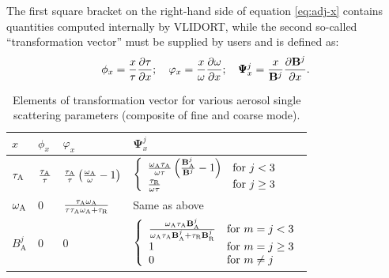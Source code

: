 The first square bracket on the right-hand side of equation
\eqref{eq:adj-x} contains quantities computed internally by VLIDORT, 
while the second so-called “transformation vector” must be supplied 
by users and is defined as:
\begin{equation}
\phi_x = \frac{x}{\tau}\frac{\partial\tau}{\partial x}; \quad 
\varphi_x = \frac{x}{\omega}\frac{\partial\omega}{\partial x}; \quad 
\pmb{\Psi}_x^j = \frac{x}{\mathbf{B}^j}\frac{\partial\mathbf{B}^j}{\partial x}.
\label{eq:lopt}
\end{equation}

\begin{table}[t]
  \centering
  \small
  \caption{Elements of transformation vector for various aerosol single
scattering parameters (composite of fine and coarse mode).}
  \label{tab:jacobian1}
  \begin{tabular}{p{2em} p{2em} p{5em} p{15em} }
    \toprule
       $x$ & $\phi_x$ & $ \varphi_x$ & $\pmb{\Psi}_x^j$ \\
    \midrule
    $\tau_\text{A}$        & $\frac{\tau_\text{A}}{\tau}$ &
$\frac{\tau_\text{A}}{\tau}\left( \frac{\omega_\text{A}}{\omega}-1\right)$ &
$\left\{ \begin{array}{ll} \frac{\omega_\text{A}\tau_\text{A}}{\omega\tau}\left(
\frac{\mathbf{B}_\text{A}^j}{\mathbf{B}^j}-1 \right)
&\mbox{for } j<3  \\ \frac{\tau_\text{R}}{\omega\tau} & \mbox{for } j\geq 3
\end{array} \right.$\\  
    $\omega_\text{A}$        & 0 & $\frac{\tau_\text{A}\omega_\text{A}}{\tau\tau_\text{A}\omega_\text{A}+\tau_\text{R}}$ &
Same as above \\
    $B_\text{A}^j$ & 0 & 0 & $\left\{ \begin{array}{ll}
\frac{\omega_\text{A}\tau_\text{A}\mathbf{B}_\text{A}^j}{\omega_\text{A}\tau_\text{A}\mathbf{B}_\text{A}^j+\tau_\text{R}\mathbf{B}_\text{R}^j}
&\mbox{for } m=j<3  \\ 1 & \mbox{for } m=j\geq 3 \\ 0 & \mbox{for }
m\neq j
\end{array} \right.$ \\
    \bottomrule
  \end{tabular}
\end{table}

